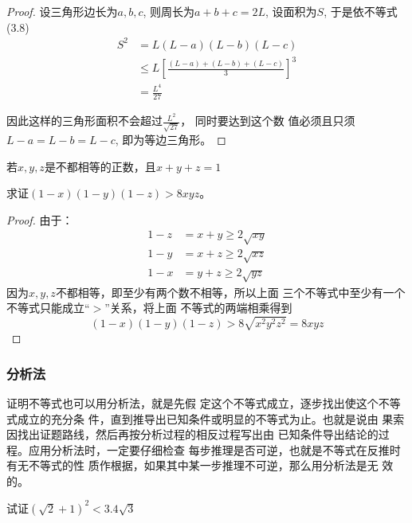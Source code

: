 \begin{proof}
    设三角形边长为$a,b,c$, 则周长为$a+b+c=2L$,
设面积为$S$, 于是依不等式(3.8)
\[\begin{split}
    S^2&=L(L-a)(L-b)(L-c)\\
&\le L\left[\frac{(L-a)+(L-b)+(L-c)}{3}\right]^3\\
&=\frac{L^4}{27}
\end{split}\]

因此这样的三角形面积不会超过$\frac{L^2}{\sqrt{27}}$，
同时要达到这个数
值必须且只须$L-a=L-b=L-c$, 即为等边三角形。
\end{proof}
    
\begin{example}
    若$x,y,z$是不都相等的正数，且$x+y+z=1$

求证$(1-x)(1-y)(1-z)>8xyz$。
\end{example}

\begin{proof}
由于：
\[\begin{split}
    1-z&=x+y\ge 2\sqrt{xy}\\
1-y&=x+z\ge 2\sqrt{xz}\\
1-x&=y+z\ge 2\sqrt{yz}
\end{split}\]   
因为$x,y,z$不都相等，即至少有两个数不相等，所以上面
三个不等式中至少有一个不等式只能成立“$>$”关系，将上面
不等式的两端相乘得到
\[(1-x)(1-y)(1-z)>8\sqrt{x^2y^2z^2}=8xyz\]
\end{proof}

\subsubsection{分析法}
证明不等式也可以用分析法，就是先假
定这个不等式成立，逐步找出使这个不等式成立的充分条
件，直到推导出已知条件或明显的不等式为止。也就是说由
果索因找出证题路线，然后再按分析过程的相反过程写出由
已知条件导出结论的过程。应用分析法时，一定要仔细检查
每步推理是否可逆，也就是不等式在反推时有无不等式的性
质作根据，如果其中某一步推理不可逆，那么用分析法是无
效的。



\begin{example}
    试证$\left(\sqrt{2}+1\right)^2 <3.4\sqrt{3}$

\end{example}

